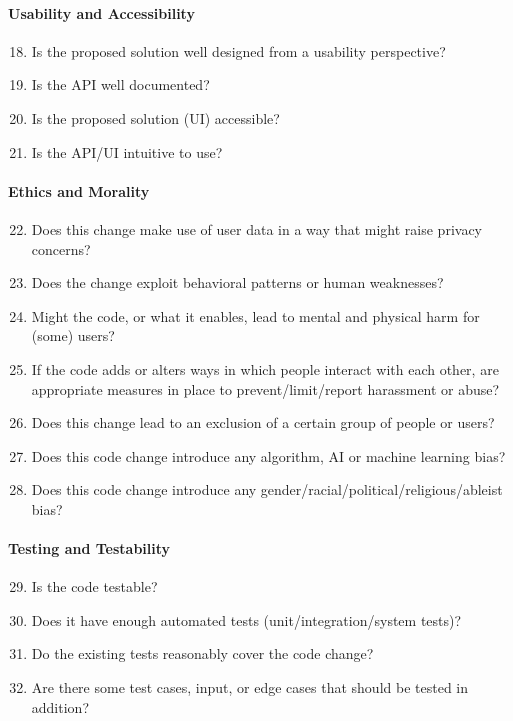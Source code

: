 \paragraph{Usability and Accessibility}
\begin{enumerate}[nosep]
 \setcounter{enumi}{17}
  \item Is the proposed solution well designed from a usability perspective?
  \item Is the API well documented?
  \item Is the proposed solution (UI) accessible?
  \item Is the API/UI intuitive to use?
\end{enumerate}
 
\paragraph{Ethics and Morality}
\begin{enumerate}[nosep]
 \setcounter{enumi}{21}
 \item Does this change make use of user data in a way that might raise privacy concerns?
 \item Does the change exploit behavioral patterns or human weaknesses?
 \item Might the code, or what it enables, lead to mental and physical harm for (some) users?
 \item If the code adds or alters ways in which people interact with each other, are appropriate measures in place to prevent/limit/report harassment or abuse?
 \item Does this change lead to an exclusion of a certain group of people or users?
 \item Does this code change introduce any algorithm, AI or machine learning bias?
 \item Does this code change introduce any gender/racial/political/religious/ableist bias?
\end{enumerate}
 
\paragraph{Testing and Testability}
\begin{enumerate}[nosep]
 \setcounter{enumi}{28}
 \item Is the code testable?
 \item Does it have enough automated tests (unit/integration/system tests)?
 \item Do the existing tests reasonably cover the code change?
 \item Are there some test cases, input, or edge cases that should be tested in addition?
\end{enumerate}
 
